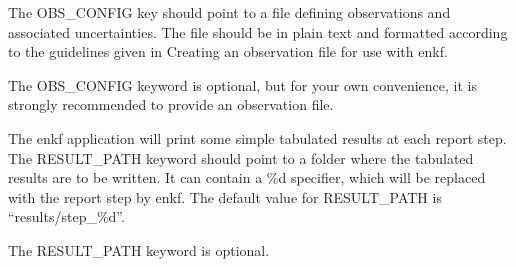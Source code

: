 \documentclass[letterpaper,10pt,english]{sphinxmanual}
\begin{document}
\label{\detokenize{keywords/index:obs-config}}
\begin{sphinxShadowBox}

The OBS\_CONFIG key should point to a file defining observations and associated
uncertainties. The file should be in plain text and formatted according to the
guidelines given in Creating an observation file for use with enkf.


%
\begin{sphinxVerbatim}[commandchars=\\\{\}]
     
 
\end{sphinxVerbatim}

The OBS\_CONFIG keyword is optional, but for your own convenience, it is
strongly recommended to provide an observation file.
\end{sphinxShadowBox}
\label{\detokenize{keywords/index:result-path}}
\begin{sphinxShadowBox}

The enkf application will print some simple tabulated results at each report
step. The RESULT\_PATH keyword should point to a folder where the tabulated
results are to be written. It can contain a \%d specifier, which will be
replaced with the report step by enkf. The default value for RESULT\_PATH is
“results/step\_\%d”.


%
\begin{sphinxVerbatim}[commandchars=\\\{\}]
  
 
\end{sphinxVerbatim}

The RESULT\_PATH keyword is optional.
\end{sphinxShadowBox}
\label{\detokenize{keywords/index:runpath}}
\end{document}
